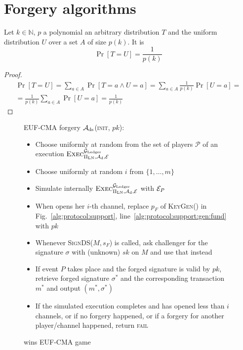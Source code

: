 \section{Forgery algorithms}
  \begin{proposition}
  \label{prop:distrib}
    Let $k \in \mathbb{N}$, $p$ a polynomial an arbitrary distribution $T$ and
    the uniform distribution $U$ over a set $A$ of size $p(k)$. It is
    \begin{equation*}
      \Pr[T = U] = \frac{1}{p(k)}
    \end{equation*}
  \end{proposition}

  \begin{proof}
    \begin{gather*}
      \Pr[T = U] = \sum\limits_{a \in A}\Pr[T = a \wedge U = a] = \sum\limits_{a
      \in A}\frac{1}{p(k)}\Pr[U = a] =\\
      = \frac{1}{p(k)}\sum\limits_{a \in A}\Pr[U = a] = \frac{1}{p(k)}
    \end{gather*}
  \end{proof}

  \begin{figure}[H]
    \begin{algobox}{\textsf{EUF-CMA} forgery}
      $\mathcal{A}_{\mathrm{ds}}$(\textsc{init}, $pk$):
      \begin{itemize}
        \item Choose uniformly at random \alice{} from the set of players
        $\mathcal{P}$ of an execution
        $\textsc{Exec}^{\mathcal{G}_{\mathrm{Ledger}}}_{\Pi_{\mathrm{LN}}, \mathcal{A}_{\mathrm{d}},
        \mathcal{E}}$
        \item Choose uniformly at random $i$ from $\{1, \dots, m\}$
        \item Simulate internally
        $\textsc{Exec}^{\mathcal{G}_{\mathrm{Ledger}}}_{\Pi_{\mathrm{LN}}, \mathcal{A}_{\mathrm{d}},
        \mathcal{E}}$ with $\mathcal{E}_P$
        \item When \alice{} opens her $i$-th channel, replace $p_F$ of
        \textsc{KeyGen}() in Fig.~\ref{alg:protocol:support},
        line~\ref{alg:protocol:support:gen:fund} with $pk$
        \item Whenever \textsc{SignDS}($M, s_F$) is called, ask challenger for
        the signature $\sigma$ with (unknown) $sk$ on $M$ and use that instead
        \item If event $P$ takes place and the forged signature is valid by
        $pk$, retrieve forged signature $\sigma^*$ and the corresponding
        transaction $m^*$ and output $(m^*, \sigma^*)$
        \item If the simulated execution completes and \alice{} has opened less
        than $i$ channels, or if no forgery happened, or if a forgery for
        another player/channel happened, return \textsc{fail}
      \end{itemize}
    \end{algobox}
    \caption{wins \textsf{EUF-CMA} game}
    \label{alg:forge:ds}
  \end{figure}

